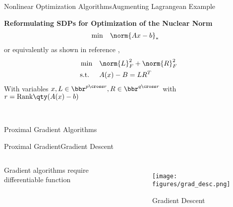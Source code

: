 \begin{frame}{Nonlinear Optimization Algorithms}{Augmenting Lagrangean Example \cite{vandenberghe2012convex}\cite{burer2003nonlinear}}
    \begin{examp}
        \textbf{Reformulating SDPs for Optimization of the Nuclear Norm}
        \begin{align}
            \min \quad & \norm{Ax-b}_*
        \end{align}
        or equivalently as shown in reference \cite{burer2003nonlinear},
        \begin{align}
            \min \quad & \norm{L}_F^2 + \norm{R}_F^2 \\
            \text{s.t. } \quad & A(x) - B = LR^T \nonumber
        \end{align}
        With variables $x, L \in \bbr^{p\cross r}, R \in \bbr^{q\cross r}$ with $r = \text{Rank}\qty(A(x) - b)$
    \end{examp}
\end{frame}









\begin{frame}{~}
    \begin{center}
        \LARGE{Proximal Gradient Algorithms}
    \end{center}
\end{frame}{}

\begin{frame}{Proximal Gradient}{Gradient Descent}
    \begin{columns}
        Gradient algorithms require {\bor differentiable} function
    \begin{figure}[htb]
        \centering
        \texttt{[image: figures/grad\_desc.png]}
        \caption{Gradient Descent}
        \label{fig:grad_desc}
    \end{figure}
    \end{columns}
\end{frame}


